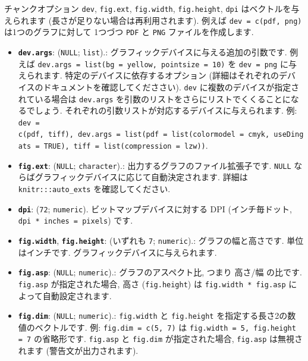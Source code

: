 \documentclass[
  11pt,
  lualatex,
  ja=standard]{bxjsreport}
\providecommand{\tightlist}{%
  \setlength{\itemsep}{0pt}\setlength{\parskip}{0pt}}
\begin{document}
チャンクオプション \texttt{dev}, \texttt{fig.ext}, \texttt{fig.width}, \texttt{fig.height}, \texttt{dpi} はベクトルを与えられます (長さが足りない場合は再利用されます). 例えば \texttt{dev = c(\textquotesingle{}pdf\textquotesingle{},\ \textquotesingle{}png\textquotesingle{})} は1つのグラフに対して 1つづつ \texttt{PDF} と \texttt{PNG} ファイルを作成します.

\begin{itemize}
\tightlist
\item
  \textbf{\texttt{dev.args}}: (\texttt{NULL}; \texttt{list}).: グラフィックデバイスに与える追加の引数です. 例えば \texttt{dev.args = list(bg = \textquotesingle{}yellow\textquotesingle{},\ pointsize\ =\ 10)} を \texttt{dev = \textquotesingle{}png\textquotesingle{}} に与えられます. 特定のデバイスに依存するオプション (詳細はそれぞれのデバイスのドキュメントを確認してくだささい). \texttt{dev} に複数のデバイスが指定されている場合は \texttt{dev.args} を引数のリストをさらにリストでくくることになるでしょう. それぞれの引数リストが対応するデバイスに与えられます. 例: \texttt{dev = c(\textquotesingle{}pdf\textquotesingle{},\ \textquotesingle{}tiff\textquotesingle{}),\ dev.args\ =\ list(pdf\ =\ list(colormodel\ =\ \textquotesingle{}cmyk\textquotesingle{},\ useDingats\ =\ TRUE),\ tiff\ =\ list(compression\ =\ \textquotesingle{}lzw\textquotesingle{}))}.
\item
  \textbf{\texttt{fig.ext}}: (\texttt{NULL}; \texttt{character}).: 出力するグラフのファイル拡張子です. \texttt{NULL} ならばグラフィックデバイスに応じて自動決定されます. 詳細は \texttt{knitr:::auto\_exts} を確認してください.
\item
  \textbf{\texttt{dpi}}: (\texttt{72}; \texttt{numeric}). ビットマップデバイスに対する DPI (インチ毎ドット, \texttt{dpi * inches = pixels}) です.
\item
  \textbf{\texttt{fig.width}}, \textbf{\texttt{fig.height}}: (いずれも \texttt{7}; \texttt{numeric}).: グラフの幅と高さです. 単位はインチです. グラフィックデバイスに与えられます.
\item
  \textbf{\texttt{fig.asp}}: (\texttt{NULL}; \texttt{numeric}).: グラフのアスペクト比, つまり 高さ/幅 の比です. \texttt{fig.asp} が指定された場合, 高さ (\texttt{fig.height}) は \texttt{fig.width * fig.asp} によって自動設定されます.
\item
  \textbf{\texttt{fig.dim}}: (\texttt{NULL}; \texttt{numeric}).: \texttt{fig.width} と \texttt{fig.height} を指定する長さ2の数値のベクトルです. 例: \texttt{fig.dim = c(5, 7)} は \texttt{fig.width = 5, fig.height = 7} の省略形です. \texttt{fig.asp} と \texttt{fig.dim} が指定された場合, \texttt{fig.asp} は無視されます (警告文が出力されます).

\end{itemize}
\end{document}
